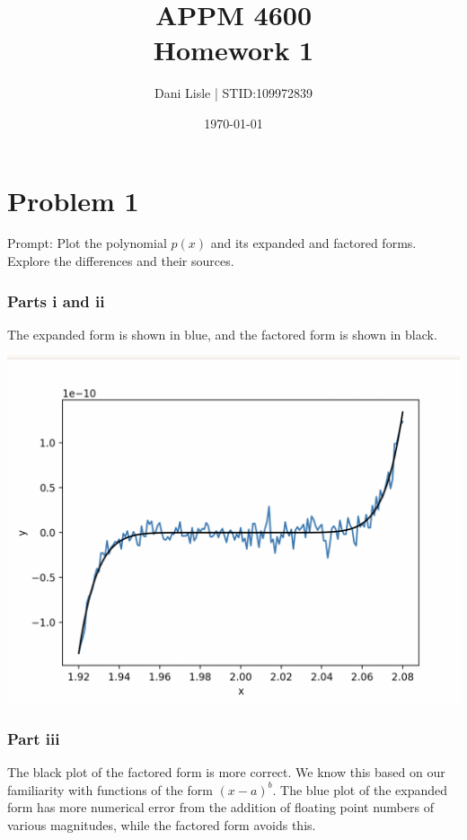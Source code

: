 \documentclass[12pt]{article}
\title{APPM 4600 \\ Homework 1}
\author{Dani Lisle | STID:109972839}
\date{\today}
\begin{document}
\maketitle

\newpage

\section*{Problem 1}

Prompt: Plot the polynomial $p(x)$ and its expanded and factored forms. Explore the differences and their sources.

\subsubsection*{Parts i and ii}

The expanded form is shown in blue, and the factored form is shown in black.

\includegraphics[width=\textwidth]{compare_polynomial_with_approx.png}




\subsubsection*{Part iii}

The black plot of the factored form is more correct. We know this based on our familiarity with functions of the form $(x-a)^b$. The blue plot of the expanded form has more numerical error from the addition of floating point numbers of various magnitudes, while the factored form avoids this.
\end{document}

